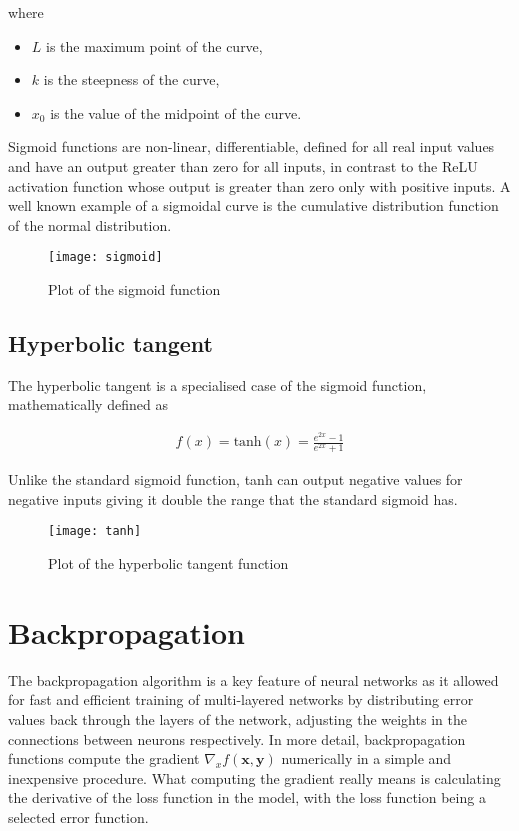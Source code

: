 where 
\begin{itemize}[nosep]
    \item[] $L$ is the maximum point of the curve,
    \item[] $k$ is the steepness of the curve,
    \item[] $x_0$ is the value of the midpoint of the curve. 
\end{itemize}

Sigmoid functions are non-linear, differentiable, defined for all real input values and have an output greater than zero for all inputs, in contrast to the ReLU activation function whose output is greater than zero only with positive inputs. A well known example of a sigmoidal curve is the cumulative distribution function of the normal distribution.

\begin{figure}[H]
    \centering
    \texttt{[image: sigmoid]}
    \caption{Plot of the sigmoid function}
    \label{tab:sigmoid}
\end{figure}

\subsection{Hyperbolic tangent}
The hyperbolic tangent is a specialised case of the sigmoid function, mathematically defined as 

\begin{align}
    f(x) = \text{tanh}(x) = \frac{e^{2x} - 1}{e^{2x} + 1}
\end{align}

Unlike the standard sigmoid function, tanh can output negative values for negative inputs giving it double the range that the standard sigmoid has.

\begin{figure}[H]
    \centering
    \texttt{[image: tanh]}
    \caption{Plot of the hyperbolic tangent function}
    \label{tab:tanh}
\end{figure}

\section{Backpropagation}
The backpropagation algorithm is a key feature of neural networks as it allowed for fast and efficient training of multi-layered networks by distributing error values back through the layers of the network, adjusting the weights in the connections between neurons respectively. In more detail, backpropagation functions compute the gradient $\nabla_{x}f(\mathbf{x}, \mathbf{y})$ numerically in a simple and inexpensive procedure. What computing the gradient really means is calculating the derivative of the loss function in the model, with the loss function being a selected error function.

